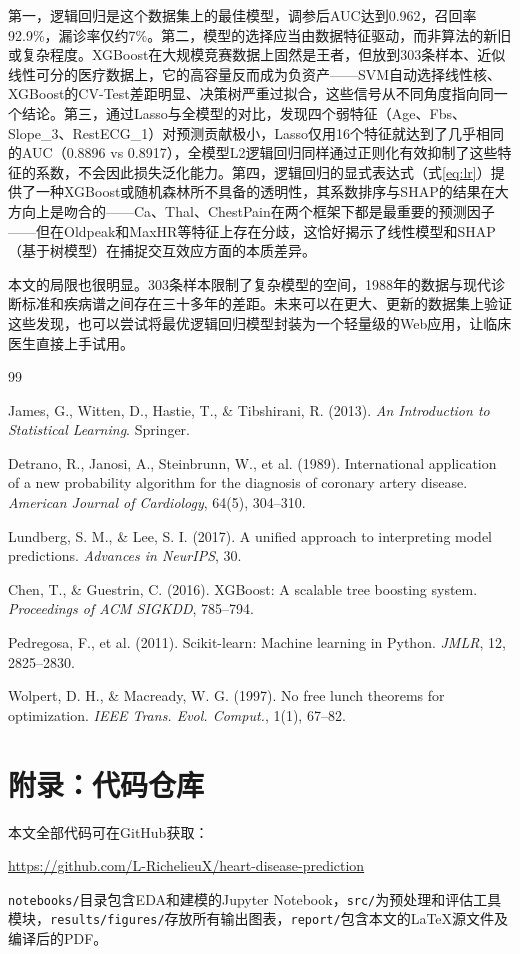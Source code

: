 \documentclass[12pt,a4paper]{ctexart}
\begin{document}
第一，逻辑回归是这个数据集上的最佳模型，调参后AUC达到0.962，召回率92.9\%，漏诊率仅约7\%。第二，模型的选择应当由数据特征驱动，而非算法的新旧或复杂程度。XGBoost在大规模竞赛数据上固然是王者，但放到303条样本、近似线性可分的医疗数据上，它的高容量反而成为负资产——SVM自动选择线性核、XGBoost的CV-Test差距明显、决策树严重过拟合，这些信号从不同角度指向同一个结论。第三，通过Lasso与全模型的对比，发现四个弱特征（Age、Fbs、Slope\_3、RestECG\_1）对预测贡献极小，Lasso仅用16个特征就达到了几乎相同的AUC（0.8896 vs 0.8917），全模型L2逻辑回归同样通过正则化有效抑制了这些特征的系数，不会因此损失泛化能力。第四，逻辑回归的显式表达式（式\ref{eq:lr}）提供了一种XGBoost或随机森林所不具备的透明性，其系数排序与SHAP的结果在大方向上是吻合的——Ca、Thal、ChestPain在两个框架下都是最重要的预测因子——但在Oldpeak和MaxHR等特征上存在分歧，这恰好揭示了线性模型和SHAP（基于树模型）在捕捉交互效应方面的本质差异。

本文的局限也很明显。303条样本限制了复杂模型的空间，1988年的数据与现代诊断标准和疾病谱之间存在三十多年的差距。未来可以在更大、更新的数据集上验证这些发现，也可以尝试将最优逻辑回归模型封装为一个轻量级的Web应用，让临床医生直接上手试用。

\begin{thebibliography}{99}

 James, G., Witten, D., Hastie, T., \& Tibshirani, R. (2013). \textit{An Introduction to Statistical Learning}. Springer.

 Detrano, R., Janosi, A., Steinbrunn, W., et al. (1989). International application of a new probability algorithm for the diagnosis of coronary artery disease. \textit{American Journal of Cardiology}, 64(5), 304--310.

 Lundberg, S. M., \& Lee, S. I. (2017). A unified approach to interpreting model predictions. \textit{Advances in NeurIPS}, 30.

 Chen, T., \& Guestrin, C. (2016). XGBoost: A scalable tree boosting system. \textit{Proceedings of ACM SIGKDD}, 785--794.

 Pedregosa, F., et al. (2011). Scikit-learn: Machine learning in Python. \textit{JMLR}, 12, 2825--2830.

 Wolpert, D. H., \& Macready, W. G. (1997). No free lunch theorems for optimization. \textit{IEEE Trans. Evol. Comput.}, 1(1), 67--82.

\end{thebibliography}

\section*{附录：代码仓库}

本文全部代码可在GitHub获取：

\url{https://github.com/L-RichelieuX/heart-disease-prediction}

\texttt{notebooks/}目录包含EDA和建模的Jupyter Notebook，\texttt{src/}为预处理和评估工具模块，\texttt{results/figures/}存放所有输出图表，\texttt{report/}包含本文的\LaTeX{}源文件及编译后的PDF。
\end{document}
